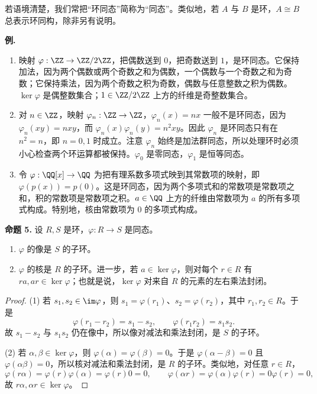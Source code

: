 若语境清楚，我们常把“环同态”简称为“同态”。类似地，若 $A$ 与 $B$ 是环，$A\cong B$ 总表示环同构，除非另有说明。

\medskip
\noindent\textbf{例.}
\begin{enumerate}[label=(\arabic*)]
  \item 映射 $\varphi:\ZZ\to\ZZ/2\ZZ$，把偶数送到 $0$，把奇数送到 $1$，是环同态。它保持加法，因为两个偶数或两个奇数之和为偶数，一个偶数与一个奇数之和为奇数；它保持乘法，因为两个奇数之积为奇数，偶数与任意整数之积为偶数。$\ker\varphi$ 是偶整数集合；$1\in\ZZ/2\ZZ$ 上方的纤维是奇整数集合。
  \item 对 $n\in\ZZ$，映射 $\varphi_n:\ZZ\to\ZZ$，$\varphi_n(x)=nx$ 一般不是环同态，因为 $\varphi_n(xy)=nxy$，而 $\varphi_n(x)\varphi_n(y)=n^2xy$。因此 $\varphi_n$ 是环同态只有在 $n^2=n$，即 $n=0,1$ 时成立。注意 $\varphi_n$ 始终是加法群同态，所以处理环时必须小心检查两个环运算都被保持。$\varphi_0$ 是零同态，$\varphi_1$ 是恒等同态。
  \item 令 $\varphi:\QQ[x]\to\QQ$ 为把有理系数多项式映到其常数项的映射，即 $\varphi(p(x))=p(0)$。这是环同态，因为两个多项式和的常数项是常数项之和，积的常数项是常数项之积。$a\in\QQ$ 上方的纤维由常数项为 $a$ 的所有多项式构成。特别地，核由常数项为 $0$ 的多项式构成。
\end{enumerate}

\medskip
\noindent\textbf{命题 5.} 设 $R,S$ 是环，$\varphi:R\to S$ 是同态。
\begin{enumerate}[label=(\arabic*)]
  \item $\varphi$ 的像是 $S$ 的子环。
  \item $\varphi$ 的核是 $R$ 的子环。进一步，若 $a\in\ker\varphi$，则对每个 $r\in R$ 有 $ra,ar\in\ker\varphi$；也就是说，$\ker\varphi$ 对来自 $R$ 的元素的左右乘法封闭。
\end{enumerate}

\begin{proof}
(1) 若 $s_1,s_2\in\im\varphi$，则 $s_1=\varphi(r_1)$、$s_2=\varphi(r_2)$，其中 $r_1,r_2\in R$。于是
\[
  \varphi(r_1-r_2)=s_1-s_2,
  \qquad \varphi(r_1r_2)=s_1s_2.
\]
故 $s_1-s_2$ 与 $s_1s_2$ 仍在像中，所以像对减法和乘法封闭，是 $S$ 的子环。

(2) 若 $\alpha,\beta\in\ker\varphi$，则 $\varphi(\alpha)=\varphi(\beta)=0$。于是 $\varphi(\alpha-\beta)=0$ 且 $\varphi(\alpha\beta)=0$，所以核对减法和乘法封闭，是 $R$ 的子环。类似地，对任意 $r\in R$，
\[
  \varphi(r\alpha)=\varphi(r)\varphi(\alpha)=\varphi(r)0=0,
  \qquad
  \varphi(\alpha r)=\varphi(\alpha)\varphi(r)=0\varphi(r)=0,
\]
故 $r\alpha,\alpha r\in\ker\varphi$。
\end{proof}

